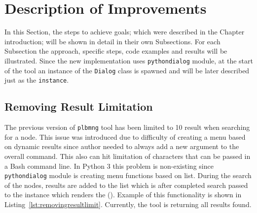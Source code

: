 \section{Description of Improvements}
\label{section:implementapproach}
In this Section, the steps to achieve goals; which were described in the Chapter introduction; will be shown in detail in their own Subsections. For each Subsection the approach, specific steps, code examples and results will be illustrated. Since the new implementation uses \texttt{pythondialog} module, at the start of the tool an instance of the \texttt{Dialog} class is spawned and will be later described just as the \texttt{instance}.
\subsection{Removing Result Limitation}
The previous version of \texttt{plbmng} tool has been limited to 10 result when searching for a node. This issue was introduced due to difficulty of creating a menu based on dynamic results since author needed to always add a new argument to the overall command. This also can hit limitation of characters that can be passed in a Bash command line. In Python 3 this problem is non-existing since \texttt{pythondialog} module is creating menu functions based on list. During the search of the nodes, results are added to the list which is after completed search passed to the instance which renders the  (). Example of this functionality is shown in Listing~\ref{lst:removingresultlimit}. Currently, the tool is returning all results found.
